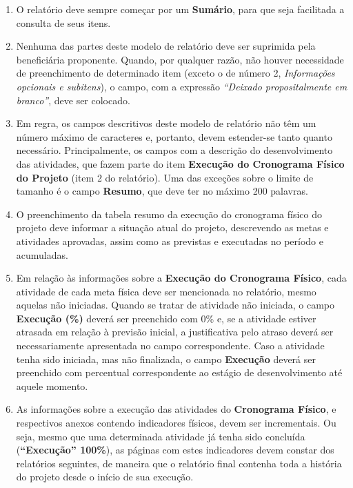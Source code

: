 \documentclass[a4paper,12pt]{article}
\begin{document}
\begin{mdframed}[linecolor=black,linewidth=1pt,backgroundcolor=gray!40]

\begin{enumerate}[label=14.\arabic*.,leftmargin=1cm]
\fontsize{10}{10}\selectfont
    \item O relatório deve sempre começar por um \textbf{Sumário}, para que seja facilitada a consulta de seus itens.
    \item Nenhuma das partes deste modelo de relatório deve ser suprimida pela beneficiária proponente. Quando, por qualquer razão, não houver necessidade de preenchimento de determinado item (exceto o de número 2, \textit{Informações opcionais e subitens}), o campo, com a expressão \textit{``Deixado propositalmente em branco''}, deve ser colocado.
    \item Em regra, os campos descritivos deste modelo de relatório não têm um número máximo de caracteres e, portanto, devem estender-se tanto quanto necessário. Principalmente, os campos com a descrição do desenvolvimento das atividades, que fazem parte do item \textbf{Execução do Cronograma Físico do Projeto} (item 2 do relatório). Uma das exceções sobre o limite de tamanho é o campo \textbf{Resumo}, que deve ter no máximo 200 palavras.
    \item O preenchimento da tabela resumo da execução do cronograma físico do projeto deve informar a situação atual do projeto, descrevendo as metas e atividades aprovadas, assim como as previstas e executadas no período e acumuladas.
    \item Em relação às informações sobre a \textbf{Execução do Cronograma Físico}, cada atividade de cada meta física deve ser mencionada no relatório, mesmo aquelas não iniciadas. Quando se tratar de atividade não iniciada, o campo \textbf{Execução (\%)} deverá ser preenchido com 0\% e, se a atividade estiver atrasada em relação à previsão inicial, a justificativa pelo atraso deverá ser necessariamente apresentada no campo correspondente. Caso a atividade tenha sido iniciada, mas não finalizada, o campo \textbf{Execução} deverá ser preenchido com percentual correspondente ao estágio de desenvolvimento até aquele momento.
    \item As informações sobre a execução das atividades do \textbf{Cronograma Físico}, e respectivos anexos contendo indicadores físicos, devem ser incrementais. Ou seja, mesmo que uma determinada atividade já tenha sido concluída (\textbf{``Execução'' 100\%}), as páginas com estes indicadores devem constar dos relatórios seguintes, de maneira que o relatório final contenha toda a história do projeto desde o início de sua execução.

\end{enumerate}
\end{mdframed}
\end{document}

